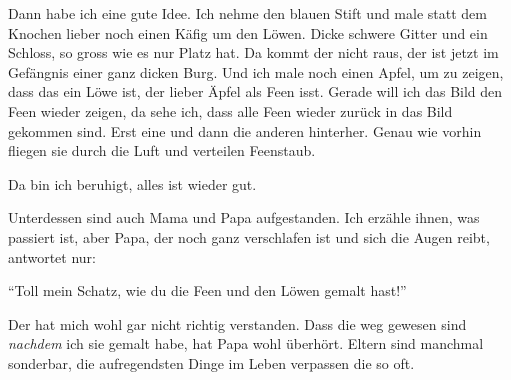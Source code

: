 Dann habe ich eine gute Idee. Ich nehme den blauen Stift und male statt dem Knochen lieber noch einen Käfig um den Löwen. Dicke schwere Gitter und ein Schloss, so gross wie es nur Platz hat. Da kommt der nicht raus, der ist jetzt im Gefängnis einer ganz dicken Burg. Und ich male noch einen Apfel, um zu zeigen, dass das ein Löwe ist, der lieber Äpfel als Feen isst. Gerade will ich das Bild den Feen wieder zeigen, da sehe ich, dass alle Feen wieder zurück in das Bild gekommen sind. Erst eine und dann die anderen hinterher. Genau wie vorhin fliegen sie durch die Luft und verteilen Feenstaub. 

Da bin ich beruhigt, alles ist wieder gut.

Unterdessen sind auch Mama und Papa aufgestanden. Ich erzähle ihnen, was passiert ist, aber Papa, der noch ganz verschlafen ist und sich die Augen reibt, antwortet nur: 

\enquote{Toll mein Schatz, wie du die Feen und den Löwen gemalt hast!} 

Der hat mich wohl gar nicht richtig verstanden. Dass die weg gewesen sind \emph{nachdem} ich sie gemalt habe, hat Papa wohl überhört. Eltern sind manchmal sonderbar, die aufregendsten Dinge im Leben verpassen die so oft. \hfill {\color{DeepPink}\decofourleft}
